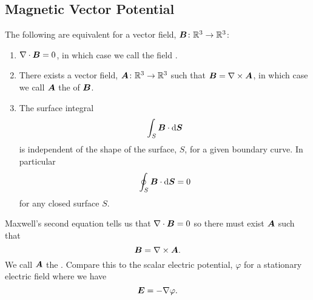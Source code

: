     \subsection{Magnetic Vector Potential}
    \begin{theorem}{}{}
        The following are equivalent for a vector field, \(\bm{B}\colon\mathbb{R}^3 \to \mathbb{R}^3\):
        \begin{enumerate}
            \item \(\nabla\cdot\bm{B} = 0\), in which case we call the field .
            \item There exists a vector field, \(\bm{A}\colon\mathbb{R}^3\to\mathbb{R}^3\) such that \(\bm{B} = \nabla\times\bm{A}\), in which case we call \(\bm{A}\) the  of \(\bm{B}\).
            \item The surface integral
            \[\int_S\bm{B}\cdot\dd{\bm{S}}\]
            is independent of the shape of the surface, \(S\), for a given boundary curve.
            In particular
            \[\oint_S\bm{B}\cdot\dd{\bm{S}} = 0\]
            for any closed surface \(S\).
        \end{enumerate}
    \end{theorem}
    Maxwell's second equation tells us that \(\nabla\cdot\bm{B} = 0\) so there must exist \(\bm{A}\) such that
    \[\bm{B} = \nabla\times\bm{A}.\]
    We call \(\bm{A}\) the .
    Compare this to the scalar electric potential, \(\varphi\) for a stationary electric field where we have
    \[\bm{E} = -\nabla\varphi.\]
    
